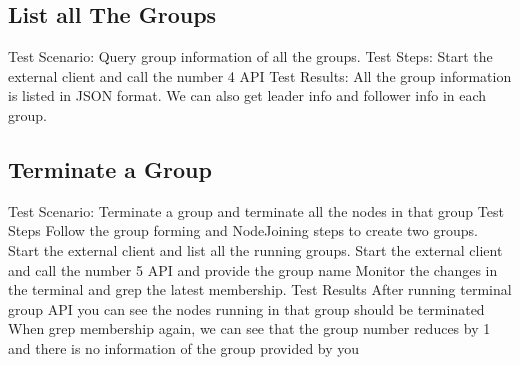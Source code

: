 \documentclass[a4paper,11pt]{article}
\begin{document}
\subsection{List all The Groups}
\begin{outline}
\1 Test Scenario: Query group information of all the groups.
\1 Test Steps: Start the external client and call the number 4 API
\1 Test Results: All the group information is listed in JSON format. We can also get leader info and follower info in each group.
\end{outline}

\subsection{Terminate a Group}
\begin{outline}
\1 Test Scenario: Terminate a group and terminate all the nodes in that group
\1 Test Steps
  \2 Follow the group forming and NodeJoining steps to create two groups.
  \2 Start the external client and list all the running groups.
  \2 Start the external client and call the number 5 API and provide the group name 
  \2 Monitor the changes in the terminal and grep the latest membership.
\1 Test Results
  \2 After running terminal group API you can see the nodes running in that group should be terminated
  \2 When grep membership again, we can see that the group number reduces by 1 and there is no information of the group provided by you
\end{outline}
\end{document}
